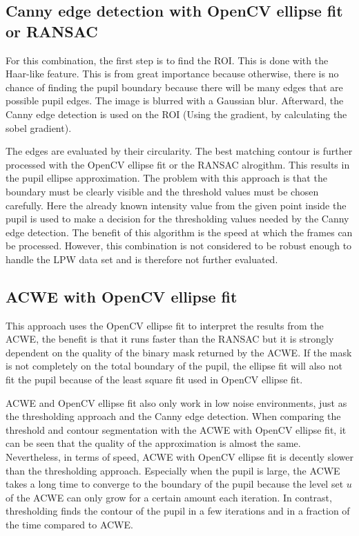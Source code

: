 \subsection{Canny edge detection with OpenCV ellipse fit or RANSAC}
For this combination, the first step is to find the ROI. This is done with the Haar-like feature. This is from great importance because otherwise, there is no chance of finding the pupil boundary because there will be many edges that are possible pupil edges. The image is blurred with a Gaussian blur. Afterward, the Canny edge detection is used on the ROI (Using the gradient, by calculating the sobel gradient). 

The edges are evaluated by their circularity. The best matching contour is further processed with the OpenCV ellipse fit or the RANSAC alrogithm. This results in the pupil ellipse approximation. The problem with this approach is that the boundary must be clearly visible and the threshold values must be chosen carefully. Here the already known intensity value from the given point inside the pupil is used to make a decision for the thresholding values needed by the Canny edge detection. The benefit of this algorithm is the speed at which the frames can be processed. However, this combination is not considered to be robust enough to handle the LPW data set and is therefore not further evaluated.

\subsection{ACWE with OpenCV ellipse fit}
This approach uses the OpenCV ellipse fit to interpret the results from the ACWE, the benefit is that it runs faster than the RANSAC but it is strongly dependent on the quality of the binary mask returned by the ACWE. If the mask is not completely on the total boundary of the pupil, the ellipse fit will also not fit the pupil because of the least square fit used in OpenCV ellipse fit. 

ACWE and OpenCV ellipse fit also only work in low noise environments, just as the thresholding approach and the Canny edge detection. When comparing the threshold and contour segmentation with the ACWE with OpenCV ellipse fit, it can be seen that the quality of the approximation is almost the same. Nevertheless, in terms of speed, ACWE with OpenCV ellipse fit is decently slower than the thresholding approach. Especially when the pupil is large, the ACWE takes a long time to converge to the boundary of the pupil because the level set $u$ of the ACWE can only grow for a certain amount each iteration. In contrast, thresholding finds the contour of the pupil in a few iterations and in a fraction of the time compared to ACWE.


